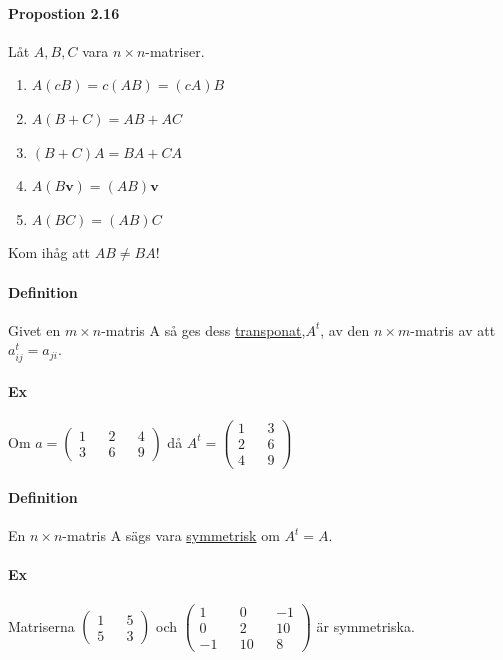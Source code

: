 \paragraph{Propostion 2.16} Låt $A,B,C$ vara $n\times n$-matriser.
\begin{enumerate}
    \item $A(cB)=c(AB)=(cA)B$
    \item $A(B+C)=AB+AC$
    \item $(B+C)A=BA+CA$
    \item $A(B\bm{v})=(AB)\bm{v}$
    \item $A(BC)=(AB)C$
\end{enumerate}
Kom ihåg att $AB\neq BA$!

\paragraph{Definition} Givet en $m\times n$-matris A så ges dess \underline{transponat},$A^{t}$, av den $n\times m$-matris av att $a^{t}_{ij}=a_{ji}$.

\paragraph{Ex} Om $a=\begin{pmatrix}
    1&&2&&4\\3&&6&&9
\end{pmatrix}$ då $A^{t}=\begin{pmatrix}
    1&&3\\2&&6\\4&&9
\end{pmatrix}$

\paragraph{Definition} En $n\times n$-matris A sägs vara \underline{symmetrisk} om $A^{t}=A$.

\paragraph{Ex} Matriserna $\begin{pmatrix}1&&5\\5&&3\end{pmatrix}$ och $\begin{pmatrix}1&&0&&-1\\0&&2&&10\\-1&&10&&8\end{pmatrix}$ är symmetriska.

